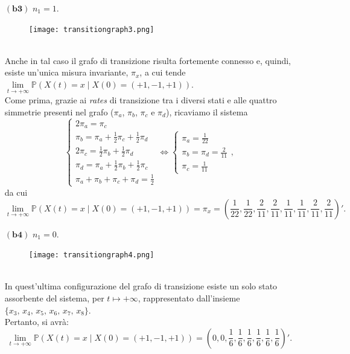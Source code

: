 \documentclass[11pt,largemargins]{homework}
\begin{document}
\begin{alphaparts}
\begin{itemize}
  
  \newpage
   \item[$\left(\textbf{b3}\right)$] $n_{1}=1$. 
 \begin{figure}[htb]\centering
\texttt{[image: transitiongraph3.png]}
  \end{figure} 
  \\
  Anche in tal caso il grafo di transizione risulta fortemente connesso e, quindi, esiste un'unica misura invariante, $\pi_{x}$, a cui tende $\lim\limits_{t \rightarrow +\infty}\mathbb{P}\left(X\left(t\right)=x\mid X\left(0\right)=\left(+1,-1,+1\right)\right).$\\
  Come prima, grazie  ai \emph{rates} di transizione tra i diversi stati e alle quattro simmetrie presenti nel grafo ($\pi_{a}$, $\pi_{b}$, $\pi_{c}$ e $\pi_{d}$), ricaviamo il sistema
  \begin{equation*}
  \begin{cases}2\pi_{a}=\pi_{c}\\
  \pi_{b}=\pi_{a}+\frac{1}{2}\pi_{c}+\frac{1}{2}\pi_{d}\\
  2\pi_{c}=\frac{1}{2}\pi_{b}+\frac{1}{2}\pi_{d}\\
  \pi_{d}=\pi_{a}+\frac{1}{2}\pi_{b}+\frac{1}{2}\pi_{c}\\
  \pi_{a}+\pi_{b}+\pi_{c}+\pi_{d}=\frac{1}{2}\end{cases}
  \Leftrightarrow
  \begin{cases}\pi_{a}=\frac{1}{22}\\
  \pi_{b}=\pi_{d}=\frac{2}{11}\\
  \pi_{c}=\frac{1}{11}\end{cases},
  \end{equation*}
  da cui
  \begin{equation*}
  \lim\limits_{t \rightarrow +\infty}\mathbb{P}\left(X\left(t\right)=x\mid X\left(0\right)=\left(+1,-1,+1\right)\right)=\pi_{x}=\left(\frac{1}{22},\frac{1}{22},\frac{2}{11},\frac{2}{11},\frac{1}{11},\frac{1}{11},\frac{2}{11},\frac{2}{11}\right)'.
  \end{equation*}
  
  \newpage
  \item[$\left(\textbf{b4}\right)$] $n_{1}=0$. 
 \begin{figure}[htb]\centering
\texttt{[image: transitiongraph4.png]}
  \end{figure}
  \\
  In quest'ultima configurazione del grafo di transizione esiste un solo stato assorbente del sistema, per $t\mapsto +\infty$, rappresentato dall'insieme $\{x_{3}, \, x_{4}, \, x_{5}, \, x_{6}, \, x_{7}, \, x_{8}\}$.\\
  Pertanto, si avrà:
  \begin{equation*}
  \lim\limits_{t \rightarrow +\infty}\mathbb{P}\left(X\left(t\right)=x\mid X\left(0\right)=\left(+1,-1,+1\right)\right)=\left(0,0,\frac{1}{6},\frac{1}{6},\frac{1}{6},\frac{1}{6},\frac{1}{6},\frac{1}{6}\right)'.
\end{equation*}
\end{itemize}




\end{alphaparts}
\end{document}
